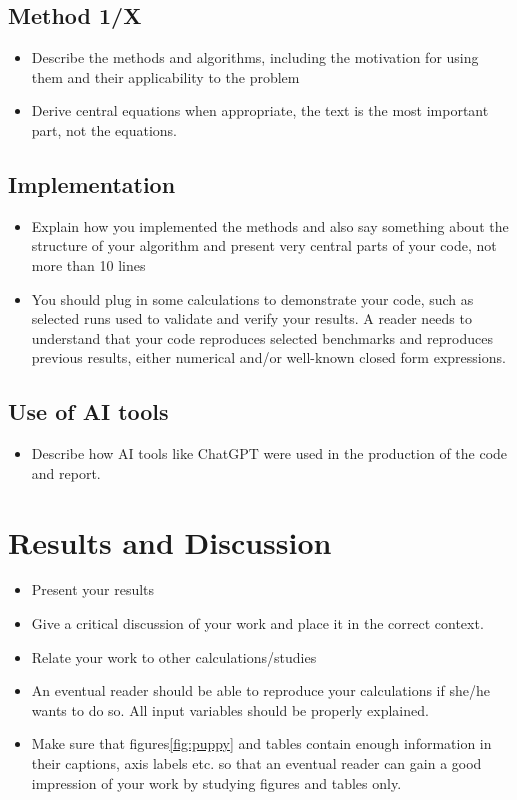 \documentclass[amssymb,twocolumn,aps]{revtex4}
\begin{document}
\subsection{Method 1/X}

\begin{itemize}
    \item Describe the methods and algorithms, including the motivation for using them and their applicability to the problem
    \item Derive central equations when appropriate, the text is the most important part, not the equations.
\end{itemize}

\subsection{Implementation}

\begin{itemize}
    \item Explain how you implemented the methods and also say something about the structure of your algorithm and present very central parts of your code, not more than 10 lines
    \item You should plug in some calculations to demonstrate your code, such as selected runs used to validate and verify your results. A reader needs to understand that your code reproduces selected benchmarks and reproduces previous results, either numerical and/or well-known closed form expressions.
\end{itemize}

\subsection{Use of AI tools}
	
\begin{itemize}
    \item Describe how AI tools like ChatGPT were used in the production of the code and report.
\end{itemize}
	
\section{Results and Discussion}\label{section:results} 

\begin{itemize}
    \item Present your results
    \item Give a critical discussion of your work and place it in the correct context.
    \item Relate your work to other calculations/studies
    \item An eventual reader should be able to reproduce your calculations if she/he wants to do so. All input variables should be properly explained.
    \item Make sure that figures\ref{fig:puppy} and tables contain enough information in their captions, axis labels etc. so that an eventual reader can gain a good impression of your work by studying figures and tables only.
\end{itemize}
\end{document}

